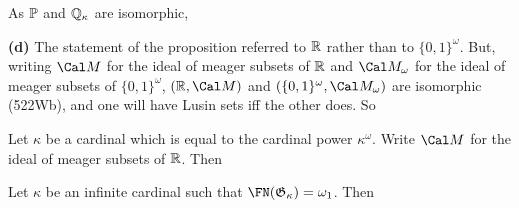 {\noindent As $\Bbb P$ and $\Bbb Q_{\kappa}$ are isomorphic,


\medskip

{\bf (d)} The statement of the proposition referred to $\Bbb R$ rather than
to $\{0,1\}^{\omega}$.   But, writing $\Cal M$ for the ideal of meager
subsets of
$\Bbb R$ and $\Cal M_{\omega}$ for the ideal of meager subsets of
$\{0,1\}^{\omega}$,
$(\Bbb R,\Cal M)$ and $(\{0,1\}^{\omega},\Cal M_{\omega})$ are isomorphic
(522Wb), and one will have Lusin sets iff the other does.   So

}%

 Let $\kappa$ be a cardinal which is equal to the
cardinal power $\kappa^{\omega}$.   Write $\Cal M$ for the ideal of meager
subsets of $\Bbb R$.   Then



 Let $\kappa$ be an infinite cardinal such that
$\FN(\frak G_{\kappa})=\omega_1$.   Then


